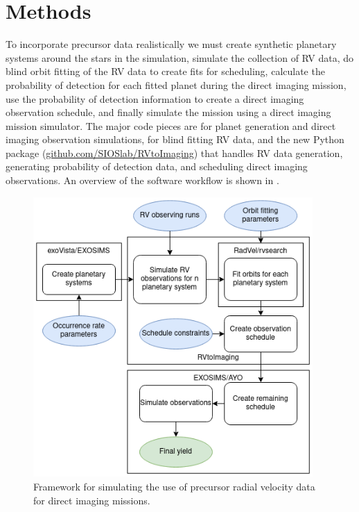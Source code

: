 \section{Methods}
To incorporate precursor data realistically we must create synthetic planetary
systems around the stars in the simulation, simulate the collection of RV data,
do blind orbit fitting of the RV data to create fits for scheduling, calculate
the probability of detection for each fitted planet during the direct imaging
mission, use the probability of detection information to create a direct
imaging observation schedule, and finally simulate the mission using a direct
imaging mission simulator. The major code pieces are  for planet
generation and direct imaging observation simulations,  for
blind fitting RV data, and the new Python package 
(\url{github.com/SIOSlab/RVtoImaging}) that handles RV data generation,
generating probability of detection data, and scheduling direct imaging
observations. An overview of the software workflow is shown in
.

\begin{figure}
  \begin{center}
    \includegraphics[width=0.95\textwidth]{ch4/figures/flowchartwhite.png}
  \end{center}
  \caption{Framework for simulating the use of precursor radial velocity data
  for direct imaging missions.}
  \label{fig:rv2imgflowchart}
\end{figure}

